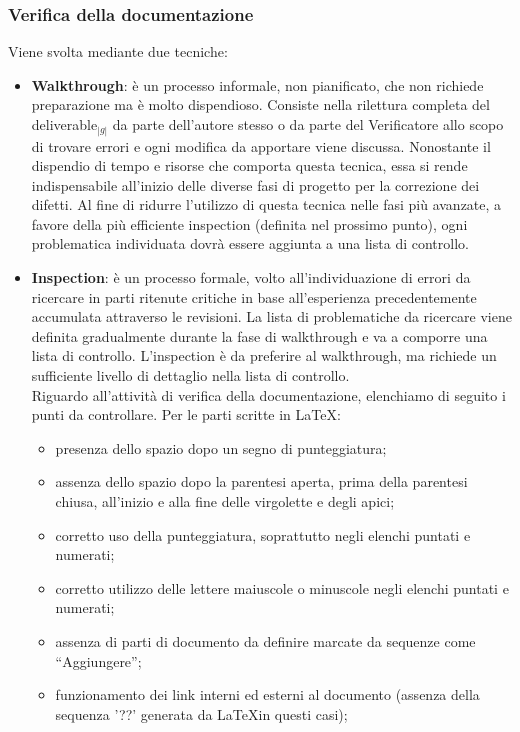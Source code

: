 {{	\subsubsection{Verifica della documentazione}{
		\label{sec:VerificaDocs}
		 Viene svolta mediante due tecniche:
		\begin{itemize}
		      \item \textbf{Walkthrough}: è un processo informale, non pianificato, che non richiede preparazione ma è molto dispendioso. 
			    Consiste nella rilettura completa del deliverable$_{|g|}$ da parte dell'autore stesso o da parte del Verificatore allo 
			    scopo di trovare errori e ogni modifica da apportare viene discussa. Nonostante il dispendio di tempo e risorse che comporta 
			    questa tecnica, essa si rende indispensabile all’inizio delle diverse fasi di progetto per la correzione dei difetti. 
			    Al fine di ridurre l’utilizzo di questa tecnica nelle fasi più avanzate, a favore della più efficiente inspection (definita 
			    nel prossimo punto), ogni problematica individuata dovrà essere aggiunta a una lista di controllo.
		      \item \textbf{Inspection}: è un processo formale, volto all’individuazione di errori da ricercare in parti ritenute critiche in base all’esperienza 
			    precedentemente accumulata attraverso le revisioni. La lista di problematiche da ricercare viene definita gradualmente durante la fase di 
			    walkthrough e va a comporre una lista di controllo. L’inspection è da preferire al walkthrough, ma richiede un sufficiente livello di dettaglio nella lista di 
			    controllo.\\
			    Riguardo all'attività di verifica della documentazione, elenchiamo di seguito i punti da controllare.
			    Per le parti scritte in \LaTeX:
			    \begin{itemize}
				\item presenza dello spazio dopo un segno di punteggiatura;
				\item assenza dello spazio dopo la parentesi aperta, prima della parentesi chiusa, all’inizio e alla fine delle virgolette e degli apici;
				\item corretto uso della punteggiatura, soprattutto negli elenchi puntati e numerati;
				\item corretto utilizzo delle lettere maiuscole o minuscole negli elenchi puntati e numerati;
				\item assenza di parti di documento da definire marcate da sequenze come “Aggiungere”;
				\item funzionamento dei link interni ed esterni al documento (assenza della sequenza '??' generata da \LaTeX in questi casi);

\end{itemize}
\end{itemize}}}}
